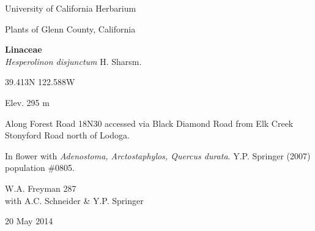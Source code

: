 \documentclass[letterpaper,10pt]{article}
\begin{document}
\begin{minipage}[t]{0.40\textwidth}

\begin{center}
University of California Herbarium \\
\begin{large}
Plants of Glenn County, California \\
\end{large}
\vspace{\baselineskip}
\textbf{Linaceae} \\
\textit{Hesperolinon disjunctum} H. Sharsm.\\
\end{center}

\begin{footnotesize}

\begin{multicols}{2}
39.413\textdegree N 122.588\textdegree W
\columnbreak
\begin{flushright}
Elev. 295 m
\end{flushright}
\end{multicols}

Along Forest Road 18N30 accessed via Black Diamond Road from Elk Creek Stonyford Road north of Lodoga.
\vspace{\baselineskip}

In flower with \textit{Adenostoma, Arctostaphylos, Quercus durata}. Y.P. Springer (2007) population \#0805.

\begin{multicols}{2}
W.A. Freyman 287 \\
with A.C. Schneider \& Y.P. Springer
\columnbreak
\begin{flushright}
20 May 2014
\end{flushright}
\end{multicols}

\end{footnotesize}

\end{minipage}

\vspace{2cm}
%
%

%
%
\end{document}

